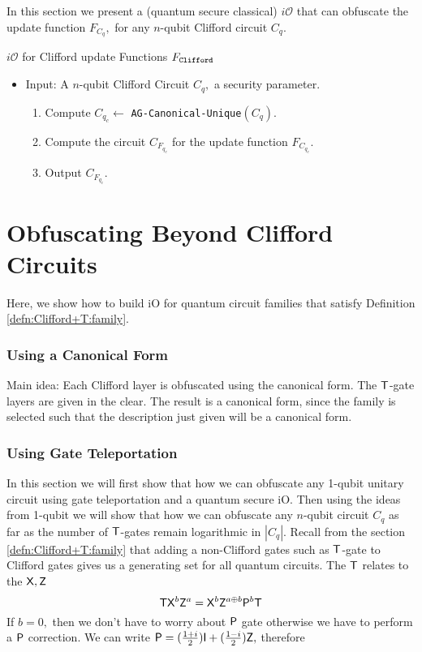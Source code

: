 In this section we present a (quantum secure classical) $i\mathcal{O}$ that can obfuscate the update function $F_{C_q},$ for any $n$-qubit Clifford circuit $C_q.$

\begin{algorithm}[H]
   \caption{$i\mathcal{O}$ for Clifford update Functions $F_{\tt Clifford}$}
  \begin{itemize}
  \item Input: A $n$-qubit Clifford Circuit $C_q,$ a security parameter.
  \begin{enumerate}
  \item Compute $C_{q_c}\leftarrow$ {\tt AG-Canonical-Unique}$(C_q).$
  \item Compute the circuit $C_{F_{q_c}}$ for the update function $F_{C_{q_c}}.$
  \item Output $C_{F_{q_c}}.$
  \end{enumerate}
  \end{itemize}
\end{algorithm}

\section{Obfuscating Beyond Clifford Circuits}
Here, we show how to build iO for quantum circuit families that satisfy Definition \ref{defn:Clifford+T:family}.

\subsubsection{Using a Canonical Form}
Main idea: Each Clifford layer is obfuscated using the canonical form. The ${\sf T}$-gate layers are given in the clear. The result is a canonical form, since the family is selected such that the description just given will be a canonical form.


\subsubsection{Using Gate Teleportation}
In this section we will first show that how we can obfuscate any 1-qubit unitary circuit using gate teleportation and a quantum secure iO. Then using the ideas from 1-qubit we will show that how we can obfuscate any $n$-qubit circuit $C_q$ as far as the number of ${\sf T}$-gates remain logarithmic in $|C_q|.$ Recall from the section \ref{defn:Clifford+T:family} that adding a non-Clifford gates  such as ${\sf T}$-gate to Clifford gates gives us a generating set for all quantum circuits. The ${\sf T}$ relates to the ${\sf X}, {\sf Z}$
$${\sf T} {\sf X}^b {\sf Z}^a={\sf X}^b {\sf Z}^{a\oplus b}{\sf P}^b {\sf T}$$
If $b=0,$ then we don't have to worry about ${\sf P}$ gate otherwise we have to perform a ${\sf P}$ correction. We can write ${\sf P}=(\frac{1+i}{2}) {\sf I} + (\frac{1-i}{2}){\sf Z},$ therefore

